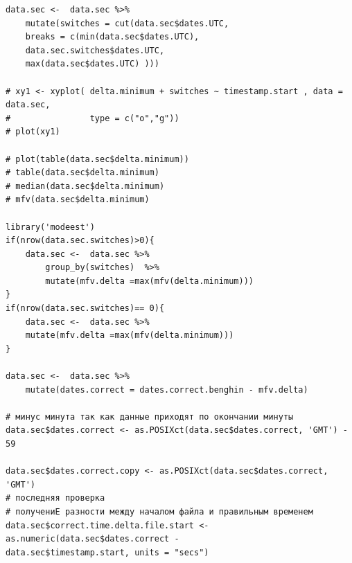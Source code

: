 \begin{lstlisting}[language={Renhanced}, ]
data.sec <-  data.sec %>%
	mutate(switches = cut(data.sec$dates.UTC, 
	breaks = c(min(data.sec$dates.UTC),
	data.sec.switches$dates.UTC,
	max(data.sec$dates.UTC) )))

# xy1 <- xyplot( delta.minimum + switches ~ timestamp.start , data = data.sec,
#                type = c("o","g"))
# plot(xy1)

# plot(table(data.sec$delta.minimum))
# table(data.sec$delta.minimum)
# median(data.sec$delta.minimum)
# mfv(data.sec$delta.minimum)

library('modeest')
if(nrow(data.sec.switches)>0){
	data.sec <-  data.sec %>%
		group_by(switches)  %>%
		mutate(mfv.delta =max(mfv(delta.minimum)))
}
if(nrow(data.sec.switches)== 0){
	data.sec <-  data.sec %>%
	mutate(mfv.delta =max(mfv(delta.minimum)))
}

data.sec <-  data.sec %>%
	mutate(dates.correct = dates.correct.benghin - mfv.delta)

# минус минута так как данные приходят по окончании минуты
data.sec$dates.correct <- as.POSIXct(data.sec$dates.correct, 'GMT') - 59

data.sec$dates.correct.copy <- as.POSIXct(data.sec$dates.correct, 'GMT')
# последняя проверка
# получениЕ разности между началом файла и правильным временем
data.sec$correct.time.delta.file.start <- as.numeric(data.sec$dates.correct - 
data.sec$timestamp.start, units = "secs")
\end{lstlisting}

%
%
%
%
%



